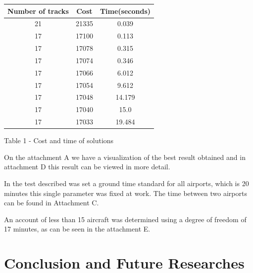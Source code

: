\documentclass{endm}
\begin{document}
\begin{center}

\renewcommand{\arraystretch}{0.7}
\label {tabela1}

\begin{tabular}{ccc} 

\hline

\footnotesize Number of tracks & \footnotesize Cost & \footnotesize Time(seconds) \\ 

\hline
\hline
\footnotesize 21 & \footnotesize 21335 & \footnotesize 0.039 \\
\footnotesize 17 & \footnotesize 17100 & \footnotesize 0.113 \\
\footnotesize 17 & \footnotesize 17078 & \footnotesize 0.315 \\
\footnotesize 17 & \footnotesize 17074 & \footnotesize 0.346 \\
\footnotesize 17 & \footnotesize 17066 & \footnotesize 6.012 \\
\footnotesize 17 & \footnotesize 17054 & \footnotesize 9.612 \\
\footnotesize 17 & \footnotesize 17048 & \footnotesize 14.179 \\
\footnotesize 17 & \footnotesize 17040 & \footnotesize 15.0 \\
\footnotesize 17 & \footnotesize 17033 & \footnotesize 19.484 \\
\hline
\end{tabular}

{\small }Table 1 - Cost and time of solutions

\end{center}

On the attachment A we have a visualization of the best result obtained and in attachment D this result can be viewed in more detail.

In the test described was set a ground time standard for all airports, which is 20 minutes this single parameter was fixed at work. The time between two airports can be found in Attachment C.

An account of less than 15 aircraft was determined using a degree of freedom of 17 minutes, as can be seen in the attachment E.

\section{Conclusion and Future Researches}
\end{document}
